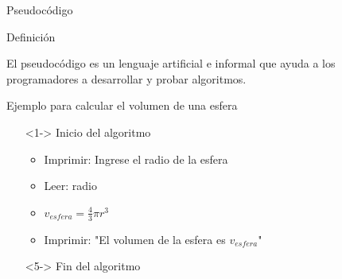 \documentclass[xcolor=pdftex,table,11pt]{beamer}
\begin{document}
\begin{frame}{Pseudocódigo}
\begin{block}{Definición}

El pseudocódigo es un lenguaje artificial e informal que ayuda a los programadores a desarrollar y probar algoritmos.
\end{block}
\begin{block}{Ejemplo para calcular el volumen de una esfera}

 \begin{itemize}
   \item[]<1-> Inicio del algoritmo

   \begin{itemize}
   
     	\item<1-> Imprimir: Ingrese el radio de la esfera
        \item<2-> Leer: radio
 		\item<3-> $v_{esfera} =\frac{4}{3}  \pi  r^3  $
 		\item<4-> Imprimir: "El volumen de la esfera es $v_{esfera}$"
   \end{itemize}
 \item[]<5-> Fin del algoritmo

	\end{itemize}
\end{block}


\end{frame}
\end{document}
